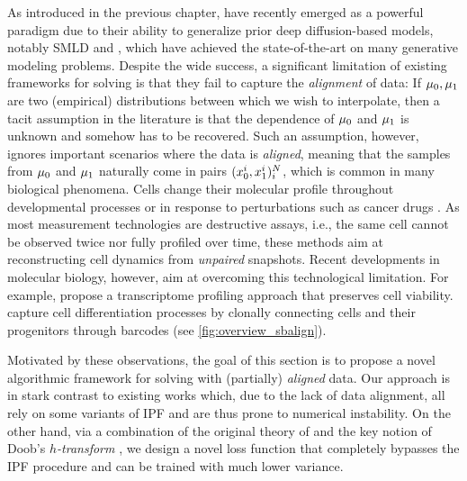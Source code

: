 As introduced in the previous chapter,  \citep{de2021diffusion,chen2021likelihood,vargas2021solving,liu2022deep} have recently emerged as a powerful paradigm due to their ability to generalize prior deep diffusion-based models, notably \acrlong{SMLD}
\citep{song2019generative,song2020score} and  \citep{ho2020denoising}, which have achieved the state-of-the-art on many generative modeling problems.
Despite the wide success, a significant limitation of existing frameworks for solving  is that they fail to capture the \emph{alignment} of data: If $\mu_0, \mu_1$ are two (empirical) distributions between which we wish to interpolate, then a tacit assumption in the literature is that the dependence of $\mu_0$ and $\mu_1$ is unknown and somehow has to be recovered. Such an assumption, however, ignores important scenarios where the data is \emph{aligned}, meaning that the samples from $\mu_0$ and $\mu_1$ naturally come in pairs $(x^i_0,x^i_1)_i^{N}$, which is common in many biological phenomena. 
Cells change their molecular profile throughout developmental processes \citep{schiebinger2019optimal,bunne2022proximal} or in response to perturbations such as cancer drugs \citep{lotfollahi2019scgen,bunne2021learning}. As most measurement technologies are destructive assays, i.e., the same cell cannot be observed twice nor fully profiled over time, these methods aim at reconstructing cell dynamics from \emph{unpaired} snapshots.
Recent developments in molecular biology, however, aim at overcoming this technological limitation. For example, \citet{chen2022live} propose a transcriptome profiling approach that preserves cell viability. \citet{weinreb2020lineage} capture cell differentiation processes by clonally connecting cells and their progenitors through barcodes (see \cref{fig:overview_sbalign}).

Motivated by these observations, the goal of this section is to propose a novel algorithmic framework for solving  with (partially) \emph{aligned} data. Our approach is in stark contrast to existing works which, due to the lack of data alignment, all rely on some variants of \acrshort{IPF} \citep{fortet1940resolution, kullback1968probability} and are thus prone to numerical instability. On the other hand, via a combination of the original theory of  \citep{schrodinger1931umkehrung,leonard2013survey} and the key notion of Doob's \emph{$h$-transform} \citep{doob1984classical, rogers2000diffusions}, we design a novel loss function that completely bypasses the \acrshort{IPF} procedure and can be trained with much lower variance. \\



